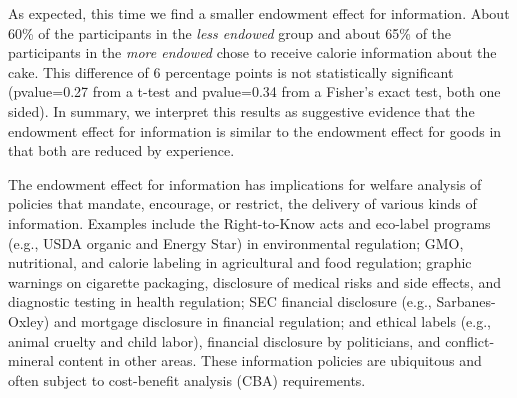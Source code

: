 
As expected, this time we find a smaller endowment effect for information. About 60\% of the participants in the \emph{less endowed} group and about 65\% of the participants in the \emph{more endowed} chose to receive calorie information about the cake. This difference of 6 percentage points is not statistically significant (pvalue=0.27 from a t-test and pvalue=0.34 from a Fisher’s exact test, both one sided). In summary, we interpret this results as suggestive evidence that the endowment effect for information is similar to the endowment effect for goods in that both are reduced by experience.


The endowment effect for information has implications for welfare analysis of policies that mandate, encourage, or restrict, the delivery of various kinds of information. Examples include the Right-to-Know acts and eco-label programs (e.g., USDA organic and Energy Star) in environmental regulation; GMO, nutritional, and calorie labeling in agricultural and food regulation; graphic warnings on cigarette packaging, disclosure of medical risks and side effects, and diagnostic testing in health regulation; SEC financial disclosure (e.g., Sarbanes-Oxley) and mortgage disclosure in financial regulation; and ethical labels (e.g., animal cruelty and child labor), financial disclosure by politicians, and conflict-mineral content in other areas. These information policies are ubiquitous and often subject to cost-benefit analysis (CBA) requirements.

